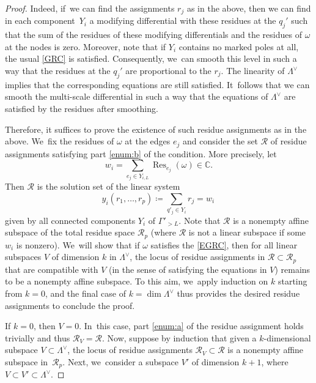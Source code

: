 \documentclass[JEP,XML,SOM,Unicode,NoFloatCountersInSection,published]{cedram}
\newcommand\CC{{\mathbb C}}
\newcommand\calR{{\mathcal R}}
\DeclareMathOperator\Res{Res}
\theoremstyle{definition}
\begin{document}
\begin{proof}
Indeed, if~we can find the assignments $r_{j}$ as in the above, then we can find in each component~$Y_{i}$ a modifying differential with these residues at the $q_{j}'$ such that the sum of the residues of these modifying differentials and the residues of $\omega$ at the nodes is zero. Moreover, note that if $Y_i$ contains no marked poles at all, the usual \ref{GRC} is satisfied. Consequently, we~can smooth this level in such a way that the residues at the $q_{j}'$ are proportional to the $r_{j}$. The linearity of $\Lambda^{\vee}$ implies that the corresponding equations are still satisfied. It~follows that we can smooth the multi-scale differential in such a way that the equations of $\Lambda^{\vee}$ are satisfied by the residues after smoothing.

Therefore, it suffices to prove the existence of such residue assignments as in the above. We~fix the residues of $\omega$ at the edges $e_{j}$ and consider the set $\calR$ of residue assignments satisfying part \eqref{enum:b} of the condition. More precisely, let
\[
w_{i}=\sum_{e_j \in Y_{i, L}}\Res_{e_j} (\omega) \in \CC.
\]
Then $\calR$ is the solution set of the linear system
\[
y_{i}(r_1,\ldots, r_p)\coloneqq\sum_{q'_j\in Y_i}r_{j}=w_{i}\,
\]
given by all connected components $Y_i$ of $\Gamma'_{>L}$.
Note that $\calR$ is a nonempty affine subspace of the total residue space $\mathcal{R}_{p}$ (where $\calR$ is not a linear subspace if some $w_i$ is nonzero). We~will show that if $\omega$ satisfies the \ref{EGRC}, then for all linear subspaces $V$ of dimension $k$ in $\Lambda^{\vee}$, the locus of residue assignments in $\calR\subset \calR_p$ that are compatible with $V$ (in the sense of satisfying the equations in $V$) remains to be a nonempty affine subspace.
To this aim, we~apply induction on $k$ starting from $k=0$, and the final case of $k=\dim \Lambda^{\vee}$ thus provides the desired residue assignments to conclude the proof.

If $k=0$, then $V=0$. In~this case, part \eqref{enum:a} of the residue assignment holds trivially and thus $\calR_{V}=\calR$.
Now, suppose by induction that given a $k$-dimensional subspace $V\subset \Lambda^{\vee}$,
the locus of residue assignments $\calR_{V}\subset \calR$ is a nonempty affine subspace in~$\calR_p$.
Next, we~consider a subspace $V'$ of dimension $k+1$, where $V\subset V'\subset \Lambda^{\vee}$.


\end{proof}
\end{document}
